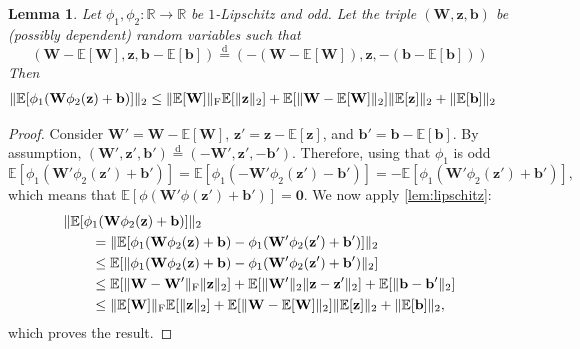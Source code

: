 \documentclass[twoside]{article}
\renewcommand{\ss}[1]{_{\text{#1}}}
\newcommand{\vnull}{\mathbf{0}}
\newcommand{\vb}{\mathbf{b}}
\newcommand{\vz}{\mathbf{z}}
\newcommand{\mW}{\mathbf{W}}
\newcommand{\E}{\mathbb{E}}
\newcommand{\R}{\mathbb{R}}
\newcommand{\disteq}{\overset{\text{d}}{=}}
\renewcommand{\ss}[1]{_{\text{#1}}}        %
\DeclarePairedDelimiter\norm{\|}{\|}             %
\theoremstyle{theoremstyle}
\newtheorem{lemma}[theorem]{Lemma}
\begin{document}
\begin{lemma} \label{lem:contraction}
    Let $\phi_1,\phi_2\colon \R \to \R$ be $1$-Lipschitz and odd.
    Let the triple $(\mW, \vz, \vb)$ be  (possibly dependent) random variables such that
    \begin{equation}
        (\mW - \E[\mW], \vz, \vb - \E[\vb])
        \disteq
        (-(\mW - \E[\mW]), \vz, -(\vb - \E[\vb]))
    \end{equation}
    Then
    \begin{align}
        &\norm{\E[\phi_1(\mW \phi_2(\vz) + \vb)]}_2 
    \le \norm{\E[\mW]}\ss{F}\E[\norm{\vz}_2] + \E[\norm{\mW - \E[\mW]}_2] \norm{\E[\vz]}_2 + \norm{\E[\vb]}_2
    \end{align}
\end{lemma}
\begin{proof}
    Consider $\mW' = \mW - \E[\mW]$, $\vz' = \vz - \E[\vz]$, and $\vb' = \vb - \E[\vb]$.
    By assumption, $(\mW', \vz', \vb') \disteq (-\mW', \vz', -\vb')$.
    Therefore, using that $\phi_1$ is odd
    \begin{equation}
        \E[\phi_1(\mW' \phi_2(\vz') + \vb')]
        = \E[\phi_1(-\mW' \phi_2(\vz')-\vb')]
        = -\E[\phi_1(\mW' \phi_2(\vz')+\vb')],
    \end{equation}
    which means that $\E[\phi(\mW' \phi(\vz')+\vb')] = \vnull$.
    We now apply \cref{lem:lipschitz}:
    \begin{align}
        &\norm{\E[\phi_1(\mW \phi_2(\vz) + \vb)]}_2 \nonumber \\
        &\qquad = \norm{\E[\phi_1(\mW \phi_2(\vz) + \vb) - \phi_1(\mW' \phi_2(\vz') + \vb')]}_2 \\
        &\qquad \le \E[\norm{\phi_1(\mW \phi_2(\vz) + \vb) - \phi_1(\mW' \phi_2(\vz') + \vb')}_2] \\
        &\qquad\le \E[ \norm{\mW - \mW'}\ss{F}\norm{\vz}_2] + \E[\norm{\mW'}_2 \norm{\vz - \vz'}_2] + \E[\norm{\vb - \vb'}_2] \\
        &\qquad\le  \norm{\E[\mW]}\ss{F}\E[\norm{\vz}_2] + \E[\norm{\mW - \E[\mW]}_2] \norm{\E[\vz]}_2 + \norm{\E[\vb]}_2,
    \end{align}
    which proves the result.
\end{proof}
\end{document}
